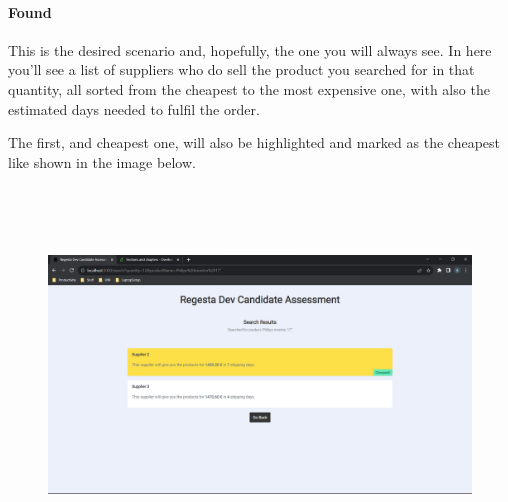 \documentclass[11pt]{article}
\begin{document}
  \paragraph*{Found}
  This is the desired scenario and, hopefully, the one you will always see. In here you'll see a list of suppliers who do sell the product you searched for in that quantity, all sorted from the cheapest to the most expensive one, with also the estimated days needed to fulfil the order.

  The first, and cheapest one, will also be highlighted and marked as the cheapest like shown in the image below.

  \begin{figure}[h]
    \centering
    \includegraphics[height=9.9601cm]{images/05.png}
  \end{figure}
\end{document}
